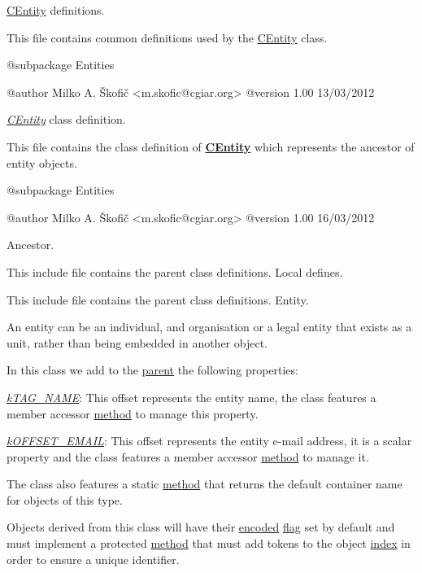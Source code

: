 \hyperlink{class_c_entity}{C\-Entity} definitions.

This file contains common definitions used by the \hyperlink{class_c_entity}{C\-Entity} class.

\begin{DoxyVerb} @subpackage        Entities

 @author            Milko A. Škofič <m.skofic@cgiar.org>
 @version   1.00 13/03/2012\end{DoxyVerb}


{\itshape \hyperlink{class_c_entity}{C\-Entity}} class definition.

This file contains the class definition of {\bfseries \hyperlink{class_c_entity}{C\-Entity}} which represents the ancestor of entity objects.

\begin{DoxyVerb} @subpackage        Entities

 @author            Milko A. Škofič <m.skofic@cgiar.org>
 @version   1.00 16/03/2012\end{DoxyVerb}


Ancestor.

This include file contains the parent class definitions. Local defines.

This include file contains the parent class definitions. Entity.

An entity can be an individual, and organisation or a legal entity that exists as a unit, rather than being embedded in another object.

In this class we add to the \hyperlink{class_c_coded_unit_object}{parent} the following properties\-:


\begin{DoxyItemize}
\item {\itshape \hyperlink{}{k\-T\-A\-G\-\_\-\-N\-A\-M\-E}}\-: This offset represents the entity name, the class features a member accessor \hyperlink{}{method} to manage this property. 
\item {\itshape \hyperlink{}{k\-O\-F\-F\-S\-E\-T\-\_\-\-E\-M\-A\-I\-L}}\-: This offset represents the entity e-\/mail address, it is a scalar property and the class features a member accessor \hyperlink{}{method} to manage it. 
\end{DoxyItemize}

The class also features a static \hyperlink{}{method} that returns the default container name for objects of this type.

Objects derived from this class will have their \hyperlink{}{encoded} \hyperlink{}{flag} set by default and must implement a protected \hyperlink{}{method} that must add tokens to the object \hyperlink{}{index} in order to ensure a unique identifier.


